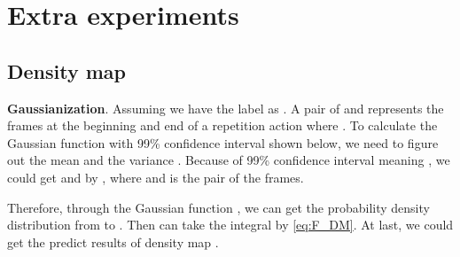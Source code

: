 \documentclass[10pt,twocolumn,letterpaper]{article}
\begin{document}
\newpage

{\small


}

\appendix
\setcounter{page}{1}

 \appendix

\section{Extra experiments}



\subsection{Density map}

\textbf{Gaussianization}.
Assuming we have the label as . A pair of  and  represents the frames at the beginning and end of a repetition action where . To calculate the Gaussian function \cite{guo2011simple} with 99\% confidence interval shown below, we need to figure out the mean  and the variance . Because of 99\% confidence interval meaning , we could get  and  by , where  and  is the pair of the frames. 

 Therefore, through the Gaussian function , we can get the probability density distribution  from  to . Then  can take the integral by \cref{eq:F_DM}. At last, we could get the predict results of density map .  
 
\end{document}
